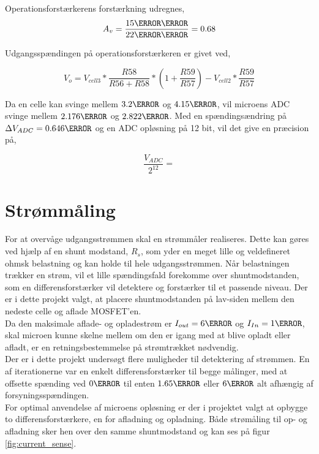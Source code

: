 Operationsforstærkerens forstærkning udregnes,
\begin {equation} 
A_{v} = \frac{15\kilo\ohm}{22\kilo\ohm} = 0.68
\end {equation}

Udgangsspændingen på operationsforstærkeren er givet ved,

\begin {equation} 
V_{o} = V_{cell3} * \frac{R58}{R56+R58} * (1+\frac{R59}{R57}) - V_{cell2} * \frac{R59}{R57}
\end {equation}

Da en celle kan svinge mellem $3.2\volt$ og $4.15\volt$, vil microens ADC svinge mellem $2.176\volt$ og $2.822\volt$.
Med en spændingsændring på $\Delta V_{ADC} = 0.646\volt$ og en ADC opløsning på 12 bit, vil det give en præcision på,

\begin {equation} 
\frac{V_{ADC}}{2^{12}} =  
\end {equation}

\section{Strømmåling}
For at overvåge udgangsstrømmen skal en strømmåler realiseres. Dette kan gøres ved hjælp af en shunt modstand, $R_{s}$, som yder en meget lille og veldefineret ohmsk belastning og kan holde til hele udgangsstrømmen. Når belastningen trækker en strøm, vil et lille spændingsfald forekomme over shuntmodstanden, som en differensforstærker vil detektere og forstærker til et passende niveau. Der er i dette projekt valgt, at placere shuntmodstanden på lav-siden mellem den nedeste celle og aflade MOSFET'en.
\\

Da den maksimale aflade- og opladestrøm  er $I_{out} = 6\ampere$ og $I_{In} = 1\ampere$, skal microen kunne skelne mellem om den er igang med at blive opladt eller afladt, er en retningsbestemmelse på strømtrækket nødvendig.
\\
Der er i dette projekt undersøgt flere muligheder til detektering af strømmen. En af iterationerne var en enkelt differensforstærker til begge målinger, med at offsette spænding ved $0\volt$ til enten $1.65\volt$ eller $6\volt$ alt afhængig af forsyningsspændingen.
\\

For optimal anvendelse af microens opløsning er der i projektet valgt at opbygge to differensforstærkere, en for afladning og opladning. Både strømåling til op- og afladning sker hen over den samme shuntmodstand og kan ses på figur \ref{fig:current_sense}.

